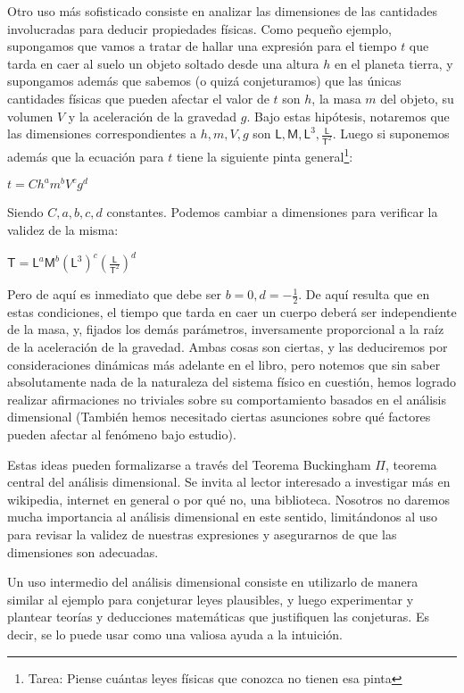 \documentclass{article}
\def\masa{\mathsf M}
\def\longitud{\mathsf L}
\def\tiempo{\mathsf T}
\begin{document}
Otro uso más sofisticado consiste en analizar las dimensiones de las cantidades involucradas para deducir propiedades físicas.
Como pequeño ejemplo, supongamos que vamos a tratar de hallar una expresión para el tiempo $t$ que tarda en caer al suelo un objeto
soltado desde una altura $h$ en el planeta tierra, y supongamos además que sabemos (o quizá conjeturamos) que las únicas
cantidades físicas que pueden afectar el valor de $t$ son $h$, la masa $m$ del objeto, su volumen $V$ y la aceleración de la
gravedad $g$. Bajo estas hipótesis, notaremos que las dimensiones correspondientes a $h,m,V,g$ son $\longitud,\masa,\longitud^3,\frac{\longitud}{\tiempo^2}$.
Luego si suponemos además que la ecuación para $t$ tiene la siguiente pinta general\footnote{Tarea: Piense cuántas leyes físicas que conozca no tienen esa pinta}:

$t = C h^am^bV^cg^d$

Siendo $C,a,b,c,d$ constantes. Podemos cambiar a dimensiones para verificar la validez de la misma:

$\tiempo = \longitud^a\masa^b(\longitud^3)^c(\frac{\longitud}{\tiempo^2})^d$

Pero de aquí es inmediato que debe ser $b=0, d = -\frac{1}{2}$. De aquí resulta que en estas condiciones, el tiempo que tarda
en caer un cuerpo deberá ser independiente de la masa, y, fijados los demás parámetros, inversamente proporcional a la raíz de la aceleración
de la gravedad. Ambas cosas son ciertas, y las deduciremos por consideraciones dinámicas más adelante en el libro, pero notemos
que sin saber absolutamente nada de la naturaleza del sistema físico en cuestión, hemos logrado realizar afirmaciones no triviales
sobre su comportamiento basados en el análisis dimensional (También hemos necesitado ciertas asunciones sobre qué factores pueden afectar al fenómeno
bajo estudio).

Estas ideas pueden formalizarse a través del Teorema Buckingham $\Pi$, teorema central del análisis dimensional. Se invita
al lector interesado a investigar más en wikipedia, internet en general o por qué no, una biblioteca. Nosotros no daremos
mucha importancia al análisis dimensional en este sentido, limitándonos al uso para revisar la validez de nuestras expresiones
y asegurarnos de que las dimensiones son adecuadas.

Un uso intermedio del análisis dimensional consiste en utilizarlo de manera similar al ejemplo para conjeturar leyes plausibles, y luego
experimentar y plantear teorías y deducciones matemáticas que justifiquen las conjeturas. Es decir, se lo puede usar como una valiosa
ayuda a la intuición.
\end{document}
